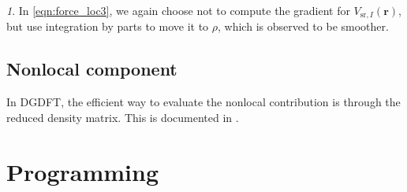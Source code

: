 \documentclass{article}
\newcommand{\bvec}[1]{\mathbf{#1}}
\newcommand{\vr}{\bvec{r}}
\theoremstyle{plain}
\theoremstyle{remark}
\newtheorem{rem}[thm]{\protect\remarkname}
\theoremstyle{plain}
\theoremstyle{plain}
\theoremstyle{plain}
\providecommand{\remarkname}{Remark}
\begin{document}
\begin{rem}
In \cref{eqn:force_loc3}, we again choose not to compute the gradient for $V_{\text{sr},I}(\vr)$, but use integration by parts to move it to $\rho$, which is observed to be smoother. 
\end{rem}

\subsection{Nonlocal component}

In DGDFT, the efficient way to evaluate the nonlocal contribution is through the reduced density matrix. This is documented in \cite[Eq. (29)]{ZhangLinHuEtAl2017}.

\section{Programming}



\end{document}
